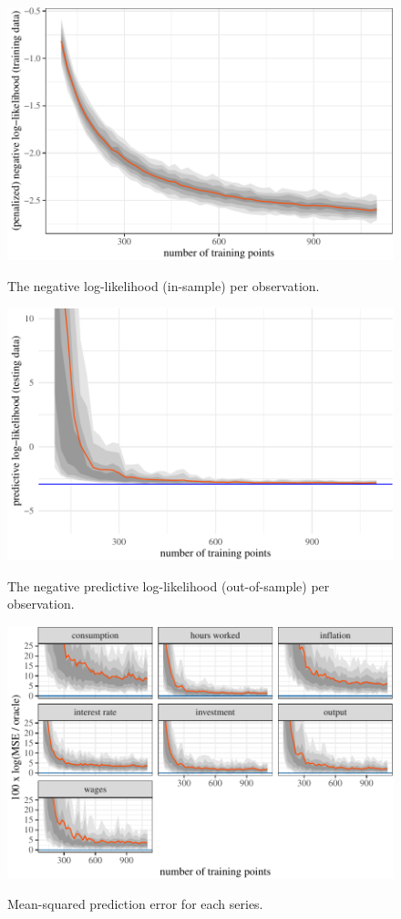 \documentclass[11pt]{article}
\begin{document}
\begin{figure}[t]
{\centering \includegraphics{gfx/pen-negll-1} }
\caption{The negative log-likelihood (in-sample) per observation.}\label{fig:pen-negll}
\end{figure}

\begin{figure}[t]
{\centering \includegraphics{gfx/predict-negll-1} }
\caption{The negative predictive log-likelihood (out-of-sample) per observation.}\label{fig:predict-negll}
\end{figure}

\begin{figure}[t]
{\centering \includegraphics{gfx/individual-series-1} }
\caption{Mean-squared prediction error for each series.}\label{fig:individual-series}
\end{figure}
\end{document}
